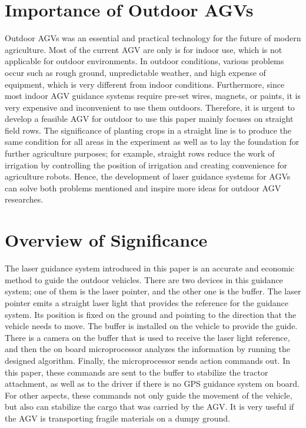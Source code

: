 \section{Importance of Outdoor AGVs}
Outdoor AGVs was an essential and practical technology for the future of modern agriculture. Most of the current AGV are only is for indoor use, which is not applicable for outdoor environments. In outdoor conditions, various problems occur such as rough ground, unpredictable weather, and high expense of equipment, which is very different from indoor conditions. Furthermore, since most indoor AGV guidance systems require pre-set wires, magnets, or paints, it is very expensive and inconvenient to use them outdoors. Therefore, it is urgent to develop a feasible AGV for outdoor to use this paper mainly focuses on straight field rows. The significance of planting crops in a straight line is to produce the same condition for all areas in the experiment as well as to lay the foundation for further agriculture purposes; for example, straight rows reduce the work of irrigation by controlling the position of irrigation and creating convenience for agriculture robots. Hence, the development of laser guidance systems for AGVs can solve both problems mentioned and inspire more ideas for outdoor AGV researches.

\section{Overview of Significance}
The laser guidance system introduced in this paper is an accurate and economic method to guide the outdoor vehicles. There are two devices in this guidance system; one of them is the laser pointer, and the other one is the buffer. The laser pointer emits a straight laser light that provides the reference for the guidance system. Its position is fixed on the ground and pointing to the direction that the vehicle needs to move. The buffer is installed on the vehicle to provide the guide. There is a camera on the buffer that is used to receive the laser light reference, and then the on board microprocessor analyzes the information by running the designed algorithm. Finally, the microprocessor sends action commands out. In this paper, these commands are sent to the buffer to stabilize the tractor attachment, as well as to the driver if there is no GPS guidance system on board. For other aspects, these commands not only guide the movement of the vehicle, but also can stabilize the cargo that was carried by the AGV. It is very useful if the AGV is transporting fragile materials on a dumpy ground.


